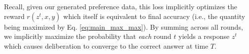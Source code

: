 \begin{remark}
    Recall, given our generated preference data, this loss implicitly optimizes the reward $r(z^t, x, y)$ which itself is equivalent to final accuracy (i.e., the quantity being maximized by Eq. \ref{eq:main_max_max}). By summing across all rounds, we implicitly maximize the probability that \emph{each} round $t$ yields a response $z^t$ which causes deliberation to converge to the correct answer at time $T$.
\end{remark}





